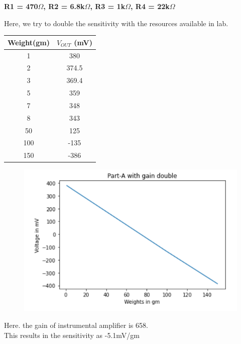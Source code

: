 \documentclass[12pt]{article}
\begin{document}
\begin{center}
\textbf{R1 = 470$\Omega $, R2 = 6.8k$\Omega $, R3 = 1k$\Omega $, R4 = 22k$\Omega $}
\end{center}
\begin{center}
Here, we try to double the sensitivity with the resources available in lab.
\begin{table}[H]
		\begin{center}
		
		\begin{tabular}{|c|c|}
			\hline
			\textbf{Weight(gm)} & \textbf{$V_{OUT}$ (mV)}\\
			\hline
			1 & 380\\
			\hline
			2 & 374.5\\
			\hline
                   3 & 369.4\\
			\hline
                   5 & 359\\
			\hline
                   7 & 348\\
			\hline
                   8 & 343\\
			\hline
50 & 125\\
			\hline
100 & -135\\
			\hline
150 & -386\\
			\hline
            
		\end{tabular}
		\end{center}
\end{table}
\end{center}
\begin{figure}[H]
\begin{center}
\includegraphics[scale = 1]{aii.PNG}
\end{center}
\end{figure}
Here. the gain of instrumental amplifier is 658.\\
This results in the sensitivity as -5.1mV/gm\\
\end{document}
